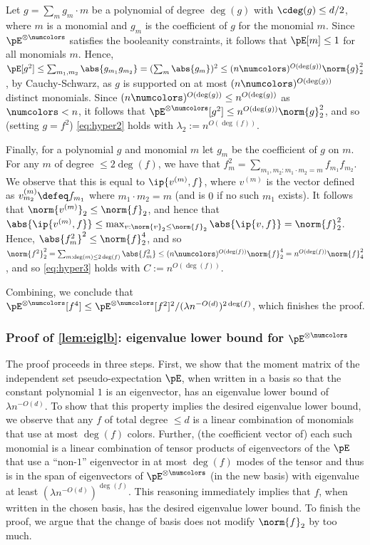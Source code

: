 Let $g = \sum_{m} g_m \cdot m$ be a polynomial of degree $\deg(g)$ with $\cdeg(g) \leq d/2$, where $m$ is a monomial and $g_m$ is the coefficient of $g$ for the monomial $m$. Since $\pE^{\otimes \numcolors}$ satisfies the booleanity constraints, it follows that $\pE[m] \leq 1$ for all monomials $m$. Hence, $\pE[g^2] \leq \sum_{m_1, m_2} \abs{g_{m_1} g_{m_2}} = (\sum_{m} \abs{g_m})^2 \leq (n\numcolors)^{O(\deg(g))} \norm{g}_2^2$, by Cauchy-Schwarz, as $g$ is supported on at most $(n \numcolors)^{O(\deg(g))}$ distinct monomials. Since $(n\numcolors)^{O(\deg(g))} \leq n^{O(\deg(g))}$ as $\numcolors < n$, it follows that $\pE^{\otimes \numcolors}[g^2] \leq n^{O(\deg(g))} \norm{g}_2^2$, and so (setting $g = f^2$) \cref{eq:hyper2} holds with $\lambda_2 := n^{O(\deg(f))}$.

Finally, for a polynomial $g$ and monomial $m$ let $g_m$ be the coefficient of $g$ on $m$. For any $m$ of degree $\leq 2 \deg(f)$, we have that $f^2_m = \sum_{m_1, m_2: m_1 \cdot m_2 = m} f_{m_1}f_{m_2}$. We observe that this is equal to $\ip{v^{(m)}, f}$, where $v^{(m)}$ is the vector defined as $v^{(m)}_{m_2} \defeq f_{m_1}$ where $m_1 \cdot m_2 = m$ (and is $0$ if no such $m_1$ exists). It follows that $\norm{v^{(m)}}_2 \leq \norm{f}_2$, and hence that $\abs{\ip{v^{(m)}, f}} \leq \max_{v : \norm{v}_2 \leq \norm{f}_2} \abs{\ip{v,f}} = \norm{f}_2^2$. Hence, $\abs{f^2_m}^2 \leq \norm{f}_2^4$, and so $\norm{f^2}_2^2 = \sum_{m : \deg(m) \leq 2 \deg(f)} \abs{f^2_m} \leq (n \numcolors)^{O(\deg(f))} \norm{f}_2^4 = n^{O(\deg(f))} \norm{f}_4^2$, and so \cref{eq:hyper3} holds with $C := n^{O(\deg(f))}$.

Combining, we conclude that $\pE^{\otimes \numcolors}[f^4] \leq  \pE^{\otimes \numcolors}[f^2]^2/(\lambda n^{-O(d)})^{2 \deg(f)}$, which finishes the proof.


\subsubsection{Proof of \cref{lem:eiglb}: eigenvalue lower bound for $\pE^{\otimes \numcolors}$}
\label{sec:eiglb}
 The proof proceeds in three steps. First, we show that the moment matrix of the independent set pseudo-expectation $\pE$, when written in a basis so that the constant polynomial $1$ is an eigenvector, has an eigenvalue lower bound of $\lambda n^{-O(d)}$. To show that this property implies the desired eigenvalue lower bound, we observe that any $f$ of total degree $\leq d$ is a linear combination of monomials that use at most $\deg(f)$ colors. Further,  (the coefficient vector of) each such monomial is a linear combination of tensor products of eigenvectors of the $\pE$ that use a ``non-$1$'' eigenvector in at most $\deg(f)$ modes of the tensor and thus is in the span of eigenvectors of $\pE^{\otimes \numcolors}$ (in the new basis) with eigenvalue at least $(\lambda n^{-O(d)})^{\deg(f)}$. This reasoning immediately implies that $f$, when written in the chosen basis, has the desired eigenvalue lower bound. To finish the proof, we argue that the change of basis does not modify $\norm{f}_2$ by too much. 

